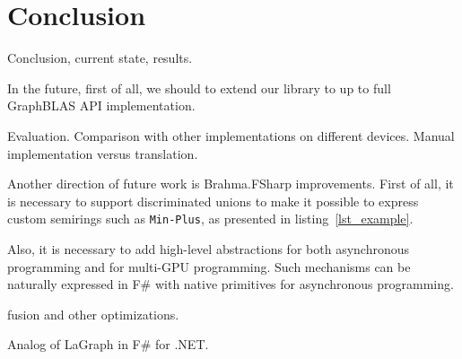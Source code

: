 \section{Conclusion}

Conclusion, current state, results.

In the future, first of all, we should to extend our library to up to full GraphBLAS API implementation.

Evaluation. Comparison with other implementations on different devices.
Manual implementation versus translation.  

Another direction of future work is Brahma.FSharp improvements. 
First of all, it is necessary to support discriminated unions to make it possible to express custom semirings such as \texttt{Min-Plus}, as presented in listing~\ref{lst_example}. 

Also, it is necessary to add high-level abstractions for both asynchronous programming and for multi-GPU programming.
Such mechanisms can be naturally expressed in F\# with native primitives for asynchronous programming.

fusion and other optimizations.

Analog of LaGraph in F\# for .NET.

